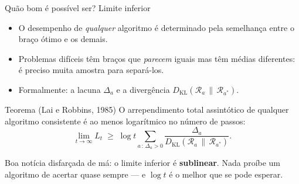 \documentclass[aspectratio=169, 10pt]{beamer}
\newcommand{\gap}{\Delta}
\newcommand{\KL}{D_{\mathrm{KL}}}
\newcommand{\Reg}{L}
\begin{document}
\begin{frame}{Quão bom é possível ser? Limite inferior}
  \begin{itemize}
    \item O desempenho de \emph{qualquer} algoritmo é determinado pela
          semelhança entre o braço ótimo e os demais.
    \item Problemas difíceis têm braços que \emph{parecem} iguais mas têm
          médias diferentes: é preciso muita amostra para separá-los.
    \item Formalmente: a lacuna $\gap_a$ e a divergência
          $\KL(\mathcal{R}_a \,\|\, \mathcal{R}_{a^{*}})$.
  \end{itemize}

  \begin{teobox}{Teorema (Lai e Robbins, 1985)}
    O arrependimento total assintótico de qualquer algoritmo consistente é
    ao menos logarítmico no número de passos:
    \[
      \lim_{t \to \infty} \Reg_t \;\ge\; \log t
        \sum_{a \,:\, \gap_a > 0} \frac{\gap_a}{\KL(\mathcal{R}_a \,\|\, \mathcal{R}_{a^{*}})}.
    \]
  \end{teobox}

  \begin{ideiabox}
    Boa notícia disfarçada de má: o limite inferior é \textbf{sublinear}.
    Nada proíbe um algoritmo de acertar quase sempre --- e $\log t$ é o
    melhor que se pode esperar.
  \end{ideiabox}
\end{frame}
\end{document}
